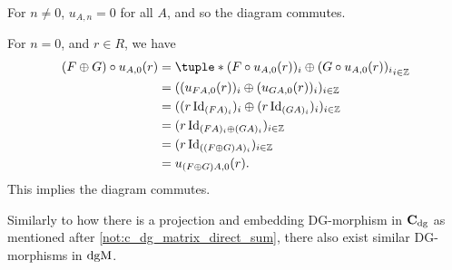 \begin{remark}
\begin{itemize}
{            For \( n \neq 0 \), \( u_{A, n} = 0 \) for all \( A \), and so the diagram commutes.

            For \( n = 0 \), and \( r \in R \), we have
            \begin{align*}
                (F \oplus G) \circ u_{A, 0} (r) &= \tuple*{ (F \circ u_{A, 0} (r))_i \oplus (G \circ u_{A, 0} (r))_i }_{i \in \Zb} \\
                &= ((u_{F A, 0} (r))_i \oplus (u_{G A, 0} (r))_i)_{i \in \Zb} \\
                &= ((r \Id_{(F A)_i})_i \oplus (r \Id_{(G A)_i})_i)_{i \in \Zb} \\
                &= (r \Id_{(F A)_i \oplus (G A)_i})_{i \in \Zb} \\
                &= (r \Id_{((F \oplus G ) A)_i })_{i \in \Zb} \\
                &= u_{(F \oplus G ) A, 0} (r).
            \end{align*}
            This implies the diagram commutes.
        }
    \end{itemize}
\end{remark}

Similarly to how there is a projection and embedding DG-morphism in \( \operatorname{\mathbf{C}}_{\operatorname{dg}} \) as mentioned after \autoref{not:c_dg_matrix_direct_sum}, there also exist similar DG-morphisms in \( \operatorname{dgM} \).

